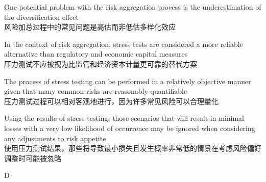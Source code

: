 \documentclass{article}
\begin{document}
\begin{choices}
    \item One potential problem with the risk aggregation process is the underestimation of the diversification effect\\
    风险加总过程中的常见问题是高估而非低估多样化效应
    \item In the context of risk aggregation, stress tests are considered a more reliable alternative than regulatory and economic capital measures\\
    压力测试不应被视为比监管和经济资本计量更可靠的替代方案
    \item The process of stress testing can be performed in a relatively objective manner given that many common risks are reasonably quantifiable\\
    压力测试过程可以相对客观地进行，因为许多常见风险可以合理量化
    \item Using the results of stress testing, those scenarios that will result in minimal losses with a very low likelihood of occurrence may be ignored when considering any adjustments to risk appetite\\
    使用压力测试结果，那些将导致最小损失且发生概率非常低的情景在考虑风险偏好调整时可能被忽略
\end{choices}

\begin{correctanswer}
    D
\end{correctanswer}
\end{document}
